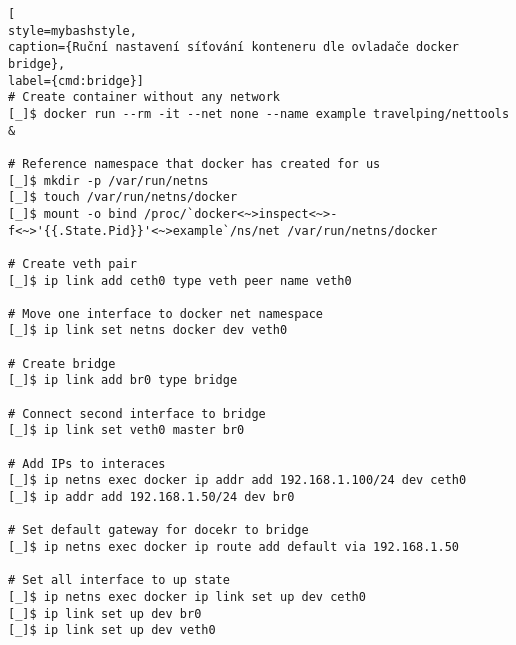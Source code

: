 \begin{lstfloat}
\begin{lstlisting}[
style=mybashstyle,
caption={Ruční nastavení síťování konteneru dle ovladače docker bridge},
label={cmd:bridge}]
# Create container without any network
[_]$ docker run --rm -it --net none --name example travelping/nettools &

# Reference namespace that docker has created for us
[_]$ mkdir -p /var/run/netns
[_]$ touch /var/run/netns/docker
[_]$ mount -o bind /proc/`docker<~>inspect<~>-f<~>'{{.State.Pid}}'<~>example`/ns/net /var/run/netns/docker

# Create veth pair
[_]$ ip link add ceth0 type veth peer name veth0

# Move one interface to docker net namespace 
[_]$ ip link set netns docker dev veth0

# Create bridge
[_]$ ip link add br0 type bridge

# Connect second interface to bridge
[_]$ ip link set veth0 master br0

# Add IPs to interaces
[_]$ ip netns exec docker ip addr add 192.168.1.100/24 dev ceth0
[_]$ ip addr add 192.168.1.50/24 dev br0

# Set default gateway for docekr to bridge
[_]$ ip netns exec docker ip route add default via 192.168.1.50

# Set all interface to up state
[_]$ ip netns exec docker ip link set up dev ceth0
[_]$ ip link set up dev br0
[_]$ ip link set up dev veth0
\end{lstlisting}
\end{lstfloat}